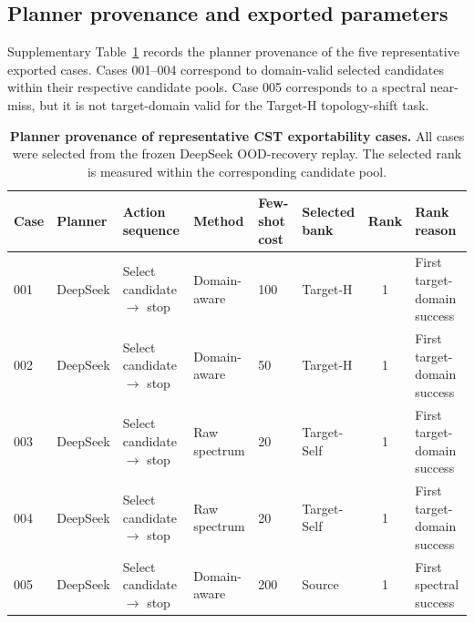 \documentclass[final,1p,times]{elsarticle}
\begin{document}
\subsection{Planner provenance and exported parameters}

Supplementary Table~\ref{tab:si_phase5_planner_provenance} records the planner provenance of the five representative exported cases. Cases 001--004 correspond to domain-valid selected candidates within their respective candidate pools. Case 005 corresponds to a spectral near-miss, but it is not target-domain valid for the Target-H topology-shift task.

\begin{table}[htbp!]
\centering
\caption{\textbf{Planner provenance of representative CST exportability cases.}
All cases were selected from the frozen DeepSeek OOD-recovery replay. The selected rank is measured within the corresponding candidate pool.}
\label{tab:si_phase5_planner_provenance}
\scriptsize
\setlength{\tabcolsep}{3.0pt}
\renewcommand{\arraystretch}{1.12}
\begin{tabular}{llllllcl}
\toprule
Case & Planner & Action sequence & Method & Few-shot cost & Selected bank & Rank & Rank reason \\
\midrule
001 & DeepSeek & Select candidate $\rightarrow$ stop & Domain-aware & 100 & Target-H & 1 & First target-domain success \\
002 & DeepSeek & Select candidate $\rightarrow$ stop & Domain-aware & 50 & Target-H & 1 & First target-domain success \\
003 & DeepSeek & Select candidate $\rightarrow$ stop & Raw spectrum & 20 & Target-Self & 1 & First target-domain success \\
004 & DeepSeek & Select candidate $\rightarrow$ stop & Raw spectrum & 20 & Target-Self & 1 & First target-domain success \\
005 & DeepSeek & Select candidate $\rightarrow$ stop & Domain-aware & 200 & Source & 1 & First spectral success \\
\bottomrule
\end{tabular}
\end{table}
\end{document}
